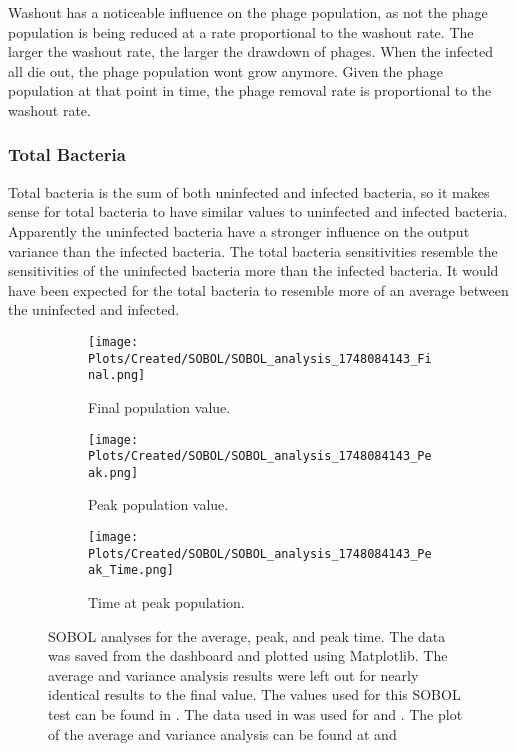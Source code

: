 Washout has a noticeable influence on the phage population, as not the phage population is being reduced at a rate proportional to the washout rate. 
The larger the washout rate, the larger the drawdown of phages. 
When the infected all die out, the phage population wont grow anymore. 
Given the phage population at that point in time, the phage removal rate is proportional to the washout rate. 

\subsubsection{Total Bacteria}
Total bacteria is the sum of both uninfected and infected bacteria, so it makes sense for total bacteria to have similar values to uninfected and infected bacteria. 
Apparently the uninfected bacteria have a stronger influence on the output variance than the infected bacteria. 
The total bacteria sensitivities resemble the sensitivities of the uninfected bacteria more than the infected bacteria. 
It would have been expected for the total bacteria to resemble more of an average between the uninfected and infected. 

\begin{figure}[h!]
    \centering
    \begin{subfigure}{0.32\linewidth}
        \centering
        \captionsetup{width=1\linewidth}
        \texttt{[image: Plots/Created/SOBOL/SOBOL\_analysis\_1748084143\_Final.png]}
        \caption{
            Final population value. 
        }
        \label{fig:created:SOBOL_final}
    \end{subfigure}
    \hfill
    \begin{subfigure}{0.32\linewidth}
        \centering
        \captionsetup{width=1\linewidth}
        \texttt{[image: Plots/Created/SOBOL/SOBOL\_analysis\_1748084143\_Peak.png]}
        \caption{
            Peak population value. 
        }
        \label{fig:created:SOBOL_peak}
    \end{subfigure}
    \hfill
    \begin{subfigure}{0.32\linewidth}
        \centering
        \captionsetup{width=1\linewidth}
        \texttt{[image: Plots/Created/SOBOL/SOBOL\_analysis\_1748084143\_Peak\_Time.png]}
        \caption{
            Time at peak population. 
        }
        \label{fig:created:SOBOL_peak_time}
    \end{subfigure}
    \caption{
        SOBOL analyses for the average, peak, and peak time. 
        The data was saved from the dashboard and plotted using Matplotlib. 
        The average and variance analysis results were left out for nearly identical results to the final value. 
        The values used for this SOBOL test can be found in . 
        The data used in  was used for  and . 
        The plot of the average and variance analysis can be found at  and 
    }
    \label{fig:created:SOBOL_analyses}
\end{figure}

